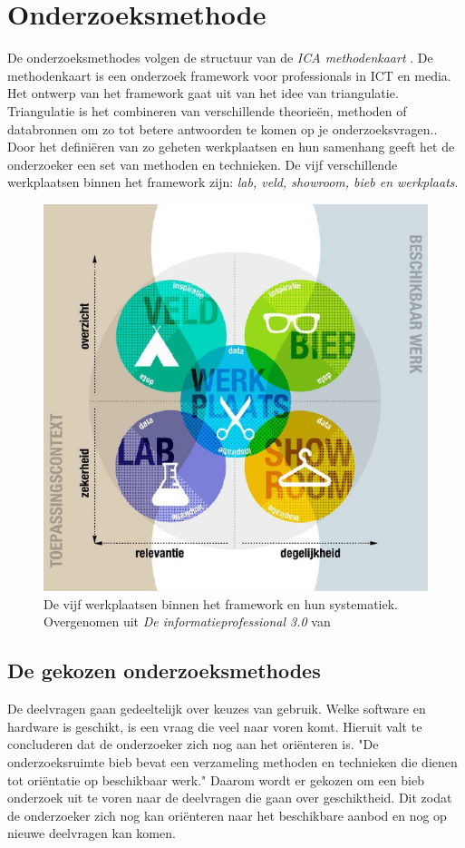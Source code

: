 \documentclass[a4paper, 11pt, oneside]{report}
\begin{document}
\section{Onderzoeksmethode}
De onderzoeksmethodes volgen de structuur van de \textit{ICA methodenkaart} \cite{MethodenKaart}.
De methodenkaart is een onderzoek framework voor professionals in ICT en media.
Het ontwerp van het framework gaat uit van het idee van triangulatie.
Triangulatie is het combineren van verschillende theorieën, methoden of databronnen om zo tot betere antwoorden te komen op je onderzoeksvragen.\cite{ICAoates}. 
Door het definiëren van zo geheten werkplaatsen en hun samenhang geeft het de onderzoeker een set van methoden en technieken. 
De vijf verschillende werkplaatsen binnen het framework zijn: \textit{lab, veld, showroom, bieb en werkplaats}.

\begin{figure}[H]
	\begin{center}\includegraphics[width=0.5\linewidth]{methodenkaart}\end{center}
	\label{fig:methodenkaart}
	\caption{De vijf werkplaatsen binnen het framework en hun systematiek. Overgenomen uit \textit{De informatieprofessional 3.0}  van \protect{}  }
\end{figure}

\subsection{De gekozen onderzoeksmethodes}

De deelvragen gaan gedeeltelijk over keuzes van gebruik. 
Welke software en hardware is geschikt, is een vraag die veel naar voren komt.
Hieruit valt te concluderen dat de onderzoeker zich nog aan het oriënteren is.
"De onderzoeksruimte bieb bevat een verzameling methoden en technieken die dienen tot oriëntatie op beschikbaar werk."\cite{MethodenKaart}
Daarom wordt er gekozen om een bieb onderzoek uit te voren naar de deelvragen die gaan over geschiktheid.
Dit zodat de onderzoeker zich nog kan oriënteren naar het beschikbare aanbod en nog op nieuwe deelvragen kan komen. 
\end{document}
